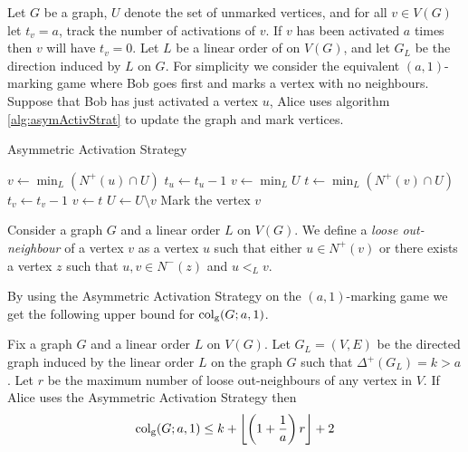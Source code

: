\begin{definition} 
    Let $G$ be a graph, $U$ denote the set of unmarked vertices, and for all $v\in V(G)$ let $t_v=a$, track the number of activations of $v$. If $v$ has been activated $a$ times then $v$ will have $t_v=0$. Let $L$ be a linear order of on $V(G)$, and let $G_L$ be the direction induced  by $L$ on $G$. 
    For simplicity we consider the equivalent $(a,1)$-marking game where Bob goes first and marks a vertex with no neighbours. Suppose that Bob has just activated a vertex $u$, Alice uses algorithm \ref{alg:asymActivStrat} to update the graph and mark vertices.
    \begin{algorithm}[h]
        \caption{Asymmetric Activation Strategy}
        \label{alg:asymActivStrat}
        \begin{algorithmic}[1]
            \Statex
                    \State $v\gets \min_L (N^+(u)\cap U)$ %
                    \State $t_u \gets t_u-1$
                    \Else 
                    \State $v\gets \min_L U$                  
                \EndIf
                    \State $t\gets \min_L (N^+(v)\cap U)$ %
                    \State $t_v \gets t_v-1$
                    \State $v\gets t$
                \EndWhile
                \State $U \gets U \setminus v$
                \State Mark the vertex $v$
            \EndFor
        \end{algorithmic}
    \end{algorithm}
\end{definition}


Consider a graph $G$ and a linear order $L$ on $V(G)$. We define a \textit{loose out-neighbour} of a vertex $v$ as a vertex $u$ such that either $u\in N^+(v)$ or there exists a vertex $z$ such that $u,v\in N^-(z)$ and $u<_L v$.

By using the Asymmetric Activation Strategy on the $(a,1)$-marking game we get the following upper bound for $\operatorname{col_g}(G;a,1)$.

\begin{theorem}
    Fix a graph $G$ and a linear order $L$ on $V(G)$. Let $G_L=(V,E)$ be the directed graph induced by the linear order $L$ on the graph $G$ such that $\Delta^+(G_L)=k>a$. Let $r$ be the maximum number of loose out-neighbours of any vertex in $V$. If Alice uses the Asymmetric Activation Strategy then \[\operatorname{col_g}(G;a,1)\leq k+\left\lfloor \left(1+\frac{1}{a}\right)r \right\rfloor +2\]
\end{theorem}

